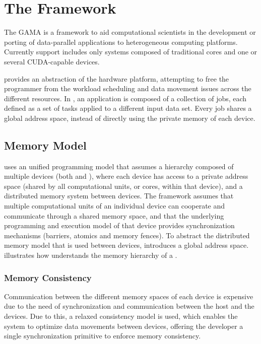 \documentclass[main.tex]{subfiles}
\begin{document}
\section{The \gama Framework} \label{section:gama}



The \acf{GAMA} is a framework to aid computational scientists in the development or porting of data-parallel applications to heterogeneous computing platforms. Currently \hetplat support includes only systems composed of traditional \cpus cores and one or several CUDA-capable \gpu devices.

\gama provides an abstraction of the hardware platform, attempting to free the programmer from the workload scheduling and data movement issues across the different resources. In \gama, an application is composed of a collection of jobs, each defined as a set of tasks applied to a different input data set. Every job shares a global address space, instead of directly using the private memory of each device.


\subsection{Memory Model}

\gama uses an unified programming model that assumes a hierarchy composed of multiple devices (both \cpus and \gpus), where each device has access to a private address space (shared by all computational units, or cores, within that device), and a distributed memory system between devices. The framework assumes that multiple computational units of an individual device can cooperate and communicate through a shared memory space, and that the underlying programming and execution model of that device provides synchronization mechanisms (barriers, atomics and memory fences).
To abstract the distributed memory model that is used between devices, \gama introduces a global address space.  illustrates how \gama understands the memory hierarchy of a \hetplat.


\subsubsection{Memory Consistency}

Communication between the different memory spaces of each device is expensive due to the need of synchronization and communication between the host \cpu and the devices. Due to this, a relaxed consistency model is used, which enables the system to optimize data movements between devices, offering the developer a single synchronization primitive to enforce memory consistency.
\end{document}
